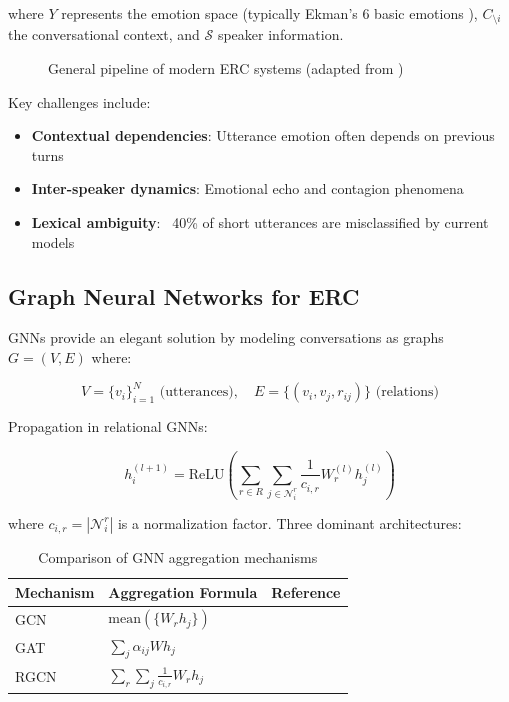 \documentclass[a4paper,11pt]{article}
\begin{document}
where $Y$ represents the emotion space (typically Ekman's 6 basic emotions \cite{ekman1992argument}), $C_{\setminus i}$ the conversational context, and $\mathcal{S}$ speaker information.

\begin{figure}[ht]
    \centering
    \caption{General pipeline of modern ERC systems (adapted from \cite{zhang2023survey})}
    \label{fig:erc_pipeline}
\end{figure}

Key challenges include:
\begin{itemize}
    \item \textbf{Contextual dependencies}: Utterance emotion often depends on previous turns \cite{ghosal2019dialoguegcn}
    \item \textbf{Inter-speaker dynamics}: Emotional echo and contagion phenomena \cite{navarretta2016mirroring}
    \item \textbf{Lexical ambiguity}: ~40\% of short utterances are misclassified by current models \cite{li2021survey}
\end{itemize}

\subsection{Graph Neural Networks for ERC}
GNNs provide an elegant solution by modeling conversations as graphs $G = (V,E)$ where:

\[
V = \{v_i\}_{i=1}^N \text{ (utterances)}, \quad E = \{(v_i,v_j,r_{ij})\} \text{ (relations)}
\]

Propagation in relational GNNs:

\[
h_i^{(l+1)} = \text{ReLU}\left(\sum_{r\in R}\sum_{j\in\mathcal{N}_i^r}\frac{1}{c_{i,r}}W_r^{(l)}h_j^{(l)}\right)
\]

where $c_{i,r} = |\mathcal{N}_i^r|$ is a normalization factor. Three dominant architectures:

\begin{table}[ht]
    \centering
    \begin{tabular}{lll}
        \toprule
        Mechanism & Aggregation Formula & Reference \\
        \midrule
        GCN & $\text{mean}(\{W_r h_j\})$ & \cite{kipf2016semi} \\
        GAT & $\sum_j \alpha_{ij} W h_j$ & \cite{velickovic2017graph} \\
        RGCN & $\sum_r\sum_j \frac{1}{c_{i,r}}W_r h_j$ & \cite{schlichtkrull2018modeling} \\
        \bottomrule
    \end{tabular}
    \caption{Comparison of GNN aggregation mechanisms}
    \label{tab:gnn_types}
\end{table}
\end{document}
